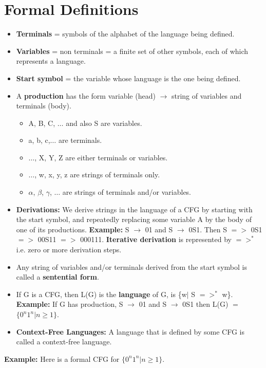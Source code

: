 \documentclass{report}
\begin{document}
\section{Formal Definitions}
\begin{itemize}
    \item \textbf{Terminals} = symbols of the alphabet of the language being defined.
    \item \textbf{Variables} = non terminals = a finite set of other symbols, each of which represents a language.
    \item \textbf{Start symbol} = the variable whose language is the one being defined.
    \item A \textbf{production} has the form variable (head) $\rightarrow$ string of variables and terminals (body).
    \begin{itemize}
        \item A, B, C, $\ldots$ and also S are variables. 
        \item a, b, c,$\ldots$ are terminals.
        \item $\ldots$, X, Y, Z are either terminals or variables.
        \item $\ldots$, w, x, y, z are strings of terminals only. 
        \item $\alpha$, $\beta$, $\gamma$, $\ldots$ are strings of terminals and/or variables.
    \end{itemize}
    \item \textbf{Derivations:} We derive strings in the language of a CFG by starting with the start symbol, and repeatedly replacing some variable A by the body of one of its productions. \textbf{Example:} S $\rightarrow$ 01 and S $\rightarrow$ 0S1. Then S $=>$ 0S1 $=>$ 00S11 $=>$ 000111. \textbf{Iterative derivation} is represented by $=>^*$ i.e. zero or more derivation steps. 
    \item Any string of variables and/or terminals derived from the start symbol is called a \textbf{sentential form}.
    \item If G is a CFG, then L(G) is the \textbf{language} of G, is \{w$|$ S $=>^*$ w\}. \textbf{Example:} If G has production, S $\rightarrow$ 01 and S $\rightarrow$ 0S1 then L(G) $=$ $\{0^n1^n|n\geqslant1\}$.  
    \item \textbf{Context-Free Languages:} A language that is defined by some CFG is called a context-free language.
\end{itemize}
\textbf{Example:} Here is a formal CFG for $\{0^n1^n|n\geqslant1\}$.
\end{document}
